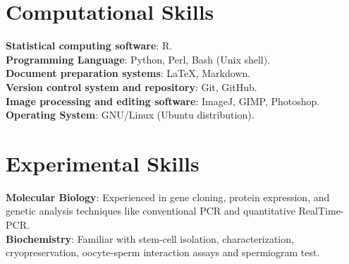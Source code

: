 \documentclass[margin,line]{res}
\begin{document}
\begin{resume}
\section{\sc Computational Skills}
{\bf Statistical computing software}: R.\\ %
{\bf Programming Language}: Python, Perl, Bash (Unix shell).\\
{\bf Document preparation systems}: LaTeX, Markdown.\\ 
{\bf Version control system and repository}: Git, GitHub.\\ %
{\bf Image processing and editing software}: ImageJ, GIMP, Photoshop.\\
{\bf Operating System}: GNU/Linux (Ubuntu distribution).\\ %

\section{\sc Experimental Skills}
{\bf Molecular Biology}: Experienced in gene cloning, protein expression, and genetic analysis techniques like conventional PCR and quantitative RealTime-PCR.\\
{\bf Biochemistry}: Familiar with stem-cell isolation, characterization, cryopreservation, oocyte-sperm interaction assays and spermiogram test.\\ %


\end{resume}
\end{document}
